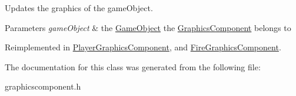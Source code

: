 Updates the graphics of the game\-Object. 


\begin{DoxyParams}{Parameters}
{\em game\-Object} & the \hyperlink{classGameObject}{Game\-Object} the \hyperlink{classGraphicsComponent}{Graphics\-Component} belongs to \\
\hline
\end{DoxyParams}


Reimplemented in \hyperlink{classPlayerGraphicsComponent_ace3901cc8345392c22315f24d617e98b}{Player\-Graphics\-Component}, and \hyperlink{classFireGraphicsComponent_a241b7300febe73c29791803784d65c4a}{Fire\-Graphics\-Component}.



The documentation for this class was generated from the following file\-:\begin{DoxyCompactItemize}
\item 
graphicscomponent.\-h\end{DoxyCompactItemize}
